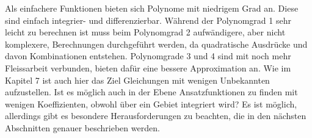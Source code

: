 Als einfachere Funktionen bieten sich Polynome mit niedrigem Grad an. Diese sind einfach integrier- und differenzierbar. Während der Polynomgrad 1 sehr leicht zu berechnen ist muss beim Polynomgrad 2 aufwändigere, aber nicht komplexere, Berechnungen durchgeführt werden, da quadratische Ausdrücke und davon Kombinationen entstehen. Polynomgrade 3 und 4 sind mit noch mehr Fleissarbeit verbunden, bieten dafür eine bessere Approximation an. Wie im Kapitel 7 ist auch hier das Ziel Gleichungen mit wenigen Unbekannten aufzustellen. Ist es möglich auch in der Ebene Ansatzfunktionen zu finden mit wenigen Koeffizienten, obwohl über ein Gebiet integriert wird? Es ist möglich, allerdings gibt es besondere Herausforderungen zu beachten, die in den nächsten Abschnitten genauer beschrieben werden.


